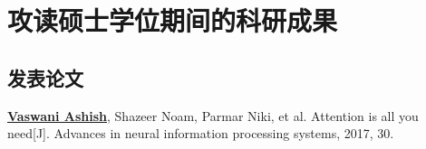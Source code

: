 \chapter{攻读硕士学位期间的科研成果}

\section*{发表论文}

\begin{enumerate}[label={[\arabic*]}]
    \item \underline{\textbf{Vaswani Ashish}}, Shazeer Noam, Parmar Niki, et al. Attention is all you need[J]. Advances in neural information processing systems, 2017, 30.
  \end{enumerate}





